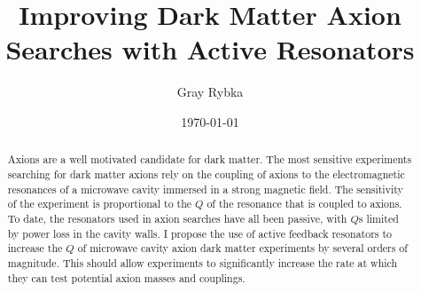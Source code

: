 \documentclass[aps,prl,twocolumn,groupedaddress]{revtex4-1}
\begin{document}

\title{Improving Dark Matter Axion Searches with Active Resonators}


\author{Gray Rybka}


\date{\today}

\begin{abstract}
Axions are a well motivated candidate for dark matter.  The most sensitive experiments searching for dark matter axions rely on the coupling of axions to the electromagnetic resonances of a microwave cavity immersed in a strong magnetic field.  The sensitivity of the experiment is proportional to the $Q$ of the resonance that is coupled to axions.
To date, the resonators used in axion searches have all been passive, with $Q$s limited by power loss in the cavity walls.  I propose the use of active feedback resonators to increase the $Q$ of microwave cavity axion dark matter experiments by several orders of magnitude.
This should allow experiments to significantly increase the rate at which they can test potential axion masses and couplings.
\end{abstract}

\pacs{}
\end{document}
